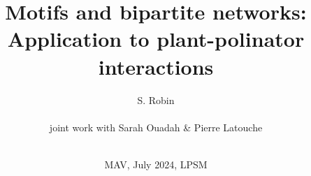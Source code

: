 \documentclass[8pt]{beamer}
\begin{document}
\title[Motifs and bipartite networks]{Motifs and bipartite networks: \\Application to plant-polinator interactions}
\author[S. Robin]{S. Robin \\ ~ \\
  joint work with Sarah Ouadah \& Pierre Latouche \\ ~ \\
}
\date[MAV, Jul'24]{MAV, July 2024, LPSM}
\maketitle


\end{document}

